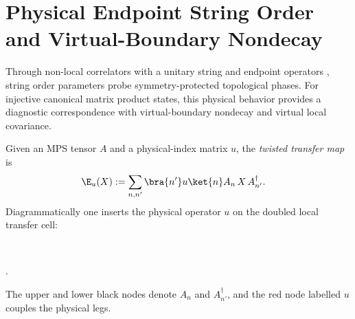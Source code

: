\section{Physical Endpoint String Order and Virtual-Boundary Nondecay}

Through non-local correlators with a unitary string and endpoint operators
\cite{PerezGarcia2008StringOrder}, string order parameters probe
symmetry-protected topological phases. For injective canonical matrix product
states, this physical behavior provides a diagnostic correspondence with
virtual-boundary nondecay and virtual local covariance.

\begin{definition}\label{def:twisted_transfer_map}
    \leanok
    Given an MPS tensor $A$ and a physical-index matrix $u$, the
    \emph{twisted transfer map} is
    \begin{align}
        \E_u(X)
         & := \sum_{n,n'} \bra{n'} u \ket{n}
        A_n\, X\, A_{n'}^\dagger.
        \label{eq:symmetry_twisted_transfer}
    \end{align}
    Diagrammatically one inserts the physical operator $u$ on the doubled
    local transfer cell:
    \begin{center}
        \tenkzkernel
        \begin{tenkz}[rows={ket,bra}, cols=1, boundary=open]
             \\
        \end{tenkz}.
    \end{center}
    The upper and lower black nodes denote $A_n$ and $A_{n'}^\dagger$, and the
    red node labelled $u$ couples the physical legs.
\end{definition}

